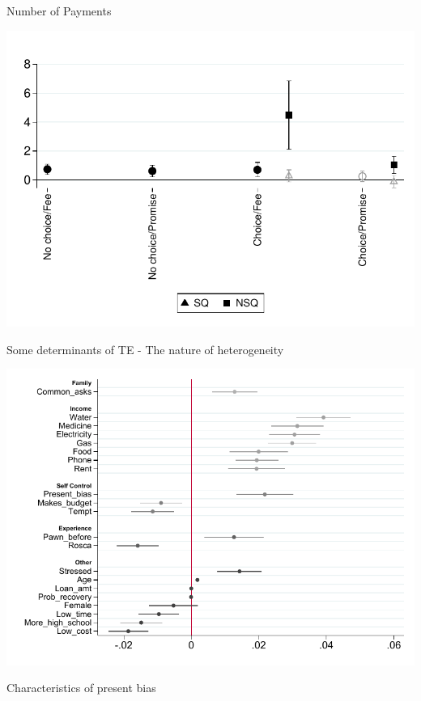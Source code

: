 \documentclass[9pt]{beamer}
\begin{document}
\begin{frame}{Number of Payments}
    \begin{center}
        \includegraphics[width=.70\textwidth]{Figuras/te_graph_num_p.pdf}
    \end{center}
\end{frame}


\begin{frame}{Some determinants of TE - The nature of heterogeneity}
    \begin{center}
        \includegraphics[width=.9\textwidth]{Figuras/he_int_vertical_des_c_pro_2.pdf}
    \end{center}
\end{frame}


\begin{frame}{Characteristics of present bias}
\begin{table}[H]
\label{pb_chars}
\begin{center}
\tiny{}
\end{center}
\end{table}
\end{frame}
\end{document}

